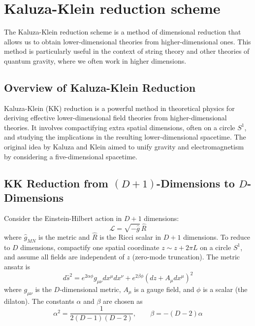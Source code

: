 
\chapter{Kaluza-Klein reduction scheme} %

\label{AppendixA} %


The Kaluza-Klein reduction scheme is a method of dimensional reduction that allows us to obtain lower-dimensional theories from higher-dimensional ones. This method is particularly useful in the context of string theory and other theories of quantum gravity, where we often work in higher dimensions.


\section*{Overview of Kaluza-Klein Reduction}
Kaluza-Klein (KK) reduction is a powerful method in theoretical physics for deriving effective lower-dimensional field theories from higher-dimensional theories. It involves compactifying extra spatial dimensions, often on a circle \( S^1 \), and studying the implications in the resulting lower-dimensional spacetime. The original idea by Kaluza and Klein aimed to unify gravity and electromagnetism by considering a five-dimensional spacetime.

\section*{KK Reduction from \((D+1)\)-Dimensions to \(D\)-Dimensions}
Consider the Einstein-Hilbert action in \( D+1 \) dimensions:
\begin{equation}
\mathcal{L} = \sqrt{-\hat{g}} \, \hat{R}
\end{equation}
where \( \hat{g}_{MN} \) is the metric and \( \hat{R} \) is the Ricci scalar in \( D+1 \) dimensions. To reduce to \( D \) dimensions, compactify one spatial coordinate \( z \sim z + 2\pi L \) on a circle \( S^1 \), and assume all fields are independent of \( z \) (zero-mode truncation). The metric ansatz is
\begin{equation}
d\hat{s}^2 = e^{2\alpha \phi} g_{\mu\nu} dx^\mu dx^\nu + e^{2\beta \phi} (dz + A_\mu dx^\mu)^2
\end{equation}
where \( g_{\mu\nu} \) is the \( D \)-dimensional metric, \( A_\mu \) is a gauge field, and \( \phi \) is a scalar (the dilaton). The constants \( \alpha \) and \( \beta \) are chosen as
\begin{equation}
\alpha^2 = \frac{1}{2(D-1)(D-2)}, \qquad \beta = -(D-2)\alpha
\end{equation}

